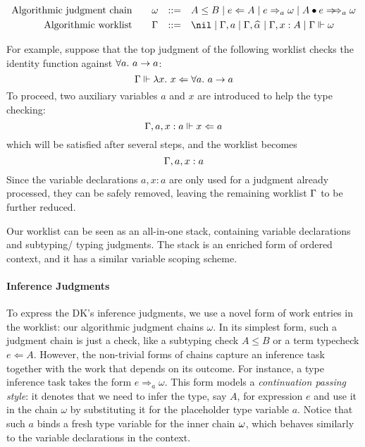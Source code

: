 
$$\begin{aligned}
\text{Algorithmic judgment chain}\qquad&\jg &::=&\quad A \le B \mid e\Lto A \mid e\To_{a} \jg \mid \appInfAlg{A}{e}\\
\text{Algorithmic worklist}\qquad&\Gm &::=&\quad \nil \mid \Gm, a \mid \Gm, \al \mid \Gm, x: A \mid \Gm \Vdash \jg\\
\end{aligned}$$

For example, suppose that the top judgment of the following worklist
checks the identity function against $\all a \to a$:
$$\Gm \Vdash \lam x \Lto \all a \to a$$
To proceed, two auxiliary variables $a$ and $x$ are introduced to help the type checking:
$$\Gamma, a, x:a \Vdash x \Leftarrow a$$
which will be satisfied after several steps, and the worklist becomes
$$\Gamma, a, x:a$$
Since the variable declarations $a, x:a$ are only used for a judgment already processed,
they can be safely removed, leaving the remaining worklist $\Gamma$ to be further reduced.

Our worklist can be seen as an all-in-one stack,
containing variable declarations and subtyping/ typing judgments.
The stack is an enriched form of ordered context,
and it has a similar variable scoping scheme.


\paragraph{Inference Judgments}
To express the DK's inference judgments, we use a novel form of work entries in
the worklist: our algorithmic judgment chains $\omega$. In its simplest form,
such a judgment chain is just a check, like a subtyping check $A \leq B$ or a
term typecheck $e \Leftarrow A$. 
However, the non-trivial forms of chains capture an
inference task together with the work that depends on its outcome. For
instance, a type inference task takes the form $e \Rightarrow_a \omega$.
This form models a \emph{continuation passing style}:
it
denotes that we need to infer the type, say $A$, for expression $e$ and use it
in the chain $\omega$ by substituting it for the placeholder type variable $a$.
Notice that such $a$ binds a fresh type variable for the inner chain $\omega$,
which behaves similarly to the variable declarations in the context.

